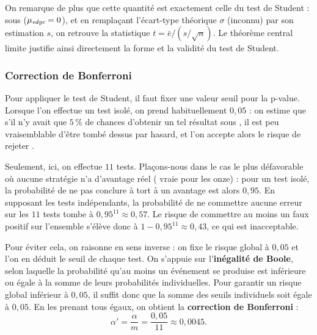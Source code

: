 On remarque de plus que cette quantité est exactement celle du test de
Student : sous \Hzero{} (\(\mu_{\textit{edge}} = 0\)), et en remplaçant l'écart-type
théorique \(\sigma\) (inconnu) par son estimation \(s\), on retrouve la
statistique \(t = \bar e / (s/\sqrt{n})\). Le théorème central limite
justifie ainsi directement la forme et la validité du test de Student.

\subsubsection*{Correction de Bonferroni}
Pour appliquer le test de Student, il faut fixer une valeur seuil pour la
p-value. Lorsque l'on effectue un test isolé, on prend habituellement
\(0{,}05\) : on estime que s'il n'y avait que \(5\,\%\) de chances
d'obtenir un tel résultat sous \Hzero{}, il est peu vraisemblable d'être
tombé dessus par hasard, et l'on accepte alors le risque de rejeter
\Hzero{}.

Seulement, ici, on effectue \(11\) tests. Plaçons-nous dans le cas le plus
défavorable où aucune stratégie n'a d'avantage réel (\Hzero{} vraie pour
les onze) : pour un test isolé, la probabilité de ne pas conclure à tort à
un avantage est alors \(0{,}95\). En supposant les tests indépendants, la
probabilité de ne commettre aucune erreur sur les \(11\) tests tombe à
\(0{,}95^{11} \approx 0{,}57\). Le risque de commettre au moins un
faux positif sur l'ensemble s'élève donc à
\(1 - 0{,}95^{11} \approx 0{,}43\), ce qui est inacceptable.

Pour éviter cela, on raisonne en sens inverse : on fixe le risque
global à \(0{,}05\) et l'on en déduit le seuil de chaque test.
On s'appuie sur l'\textbf{inégalité de Boole}, selon laquelle la
probabilité qu'au moins un événement se produise est inférieure ou égale
à la somme de leurs probabilités individuelles. Pour garantir un risque
global inférieur à \(0{,}05\), il suffit donc que la somme des seuils
individuels soit égale à \(0{,}05\). En les prenant tous égaux, on obtient
la \textbf{correction de Bonferroni} :
\[
  \alpha' = \frac{\alpha}{m} = \frac{0{,}05}{11} \approx 0{,}0045 .
\]

